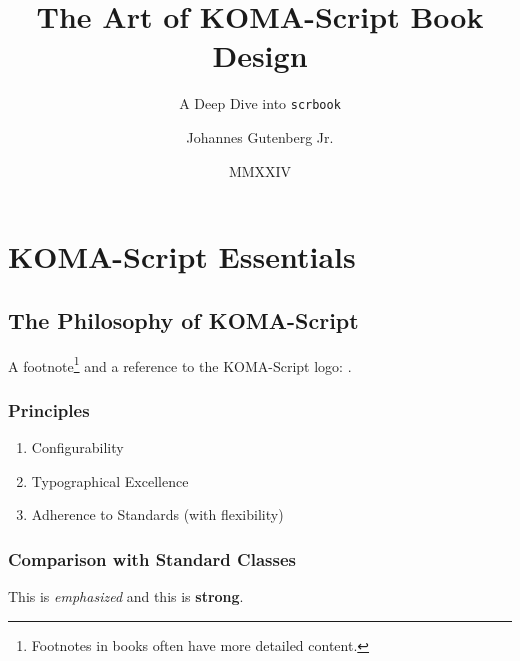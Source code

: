 \documentclass[
    a4paper,
    11pt,
    DIV=12,
    BCOR=10mm,          %
    twoside,
    headings=normal,
    open=right,         %
    toc=bibliography,
    toc=listof,
    listof=totoc,
    parskip=false,      %
    captions=tableheading,
    numbers=autoendperiod,
    appendixprefix=true,
    chapterprefix=true
]{scrbook}
\title{The Art of KOMA-Script Book Design}
\subtitle{A Deep Dive into \texttt{scrbook}}
\author{Johannes Gutenberg Jr.}
\date{MMXXIV}
\begin{document}
\frontmatter %

\maketitle

\clearpage

\tableofcontents
\listoftables
\lstlistoflistings%
\clearpage

\mainmatter %

\part{KOMA-Script Essentials}
\chapter{The Philosophy of KOMA-Script}
\lipsum[2-4]
A footnote\footnote{Footnotes in books often have more detailed content.} and a  reference to the KOMA-Script logo: \KOMAScript.

\section{Principles}
\lipsum[5-6]
\begin{enumerate}
  \item Configurability
  \item Typographical Excellence
  \item Adherence to Standards (with flexibility)
\end{enumerate}

\section{Comparison with Standard Classes}
\lipsum[7-8]
This is \textit{emphasized} and this is \textbf{strong}.
\end{document}
